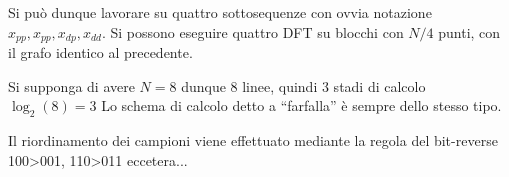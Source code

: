 Si può dunque lavorare su quattro sottosequenze con ovvia notazione $x_{pp},
x_{pp}, x_{dp}, x_{dd}$.
Si possono eseguire quattro DFT su blocchi con $N/4$ punti, con il grafo
identico al precedente.

Si supponga di avere $N=8$ dunque 8 linee, quindi 3 stadi di calcolo
$\log_2(8)=3$
Lo schema di calcolo detto a ``farfalla'' è sempre dello stesso tipo.

Il riordinamento dei campioni viene effettuato mediante la regola del
bit-reverse 100>001, 110>011 eccetera...


